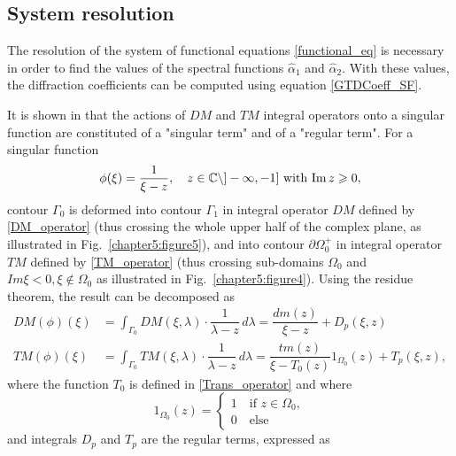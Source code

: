 \subsection{System resolution}
\label{Chapter5:System_resolution}

The resolution of the system of functional equations \eqref{functional_eq} is necessary in order to find the values of the spectral functions $\hat{\alpha}_1 $ and $\hat{\alpha}_2 $. With these values, the diffraction coefficients can be computed using equation \eqref{GTDCoeff_SF}. 

It is shown in \cite{CroisilleLebeau} that the actions of $DM$ and $TM$ integral operators onto a singular function are constituted of a "singular term" and of a "regular term". For a singular function 
\begin{equation}
\label{Chapter5:arbitrary_function}
\phi(\xi) = \dfrac{1}{\xi - z},  \quad z \in \mathbb{C}\setminus ]-\infty,-1] \text{ with } {\rm Im} \, z \geqslant 0,
\end{equation}
contour $\Gamma_0$ is deformed into contour $\Gamma_1$ in integral operator $DM$ defined by \eqref{DM_operator} (thus crossing the whole upper half of the complex plane, as illustrated in Fig.~\ref{chapter5:figure5}), and into contour $\partial \Omega_0^+$ in integral operator $TM$ defined by \eqref{TM_operator} (thus crossing sub-domains $\Omega_0$ and $Im\xi<0, \xi \notin \Omega_0$ as illustrated in Fig.~\ref{chapter5:figure4}). Using the residue theorem, the result can be decomposed as
\begin{subequations}
\label{Int_op_decomp}
\begin{align}
\label{Int_op_decomp_DM}
DM(\phi)(\xi) &= \int_{\Gamma_0} DM(\xi,\lambda) \cdot \dfrac{1}{\lambda - z} \, d \lambda = \dfrac{dm(z)}{\xi - z}  + D_p(\xi,z) \\
\label{Int_op_decomp_TM}
TM(\phi)(\xi) &= \int_{\Gamma_0} TM(\xi,\lambda) \cdot \dfrac{1}{\lambda - z} \, d \lambda = \dfrac{tm(z) }{\xi - T_0(z)} 1_{\Omega_0}(z) + T_p(\xi,z),
\end{align}
\end{subequations}
where the function $T_0$ is defined in \eqref{Trans_operator} and where
\begin{equation}
1_{\Omega_0}(z) = 
\begin{cases}
1 \quad \text{if } z  \in \Omega_0, \\
0 \quad \text{else}
\end{cases}
\end{equation}
and integrals $D_p$ and $T_p$ are the regular terms, expressed as
